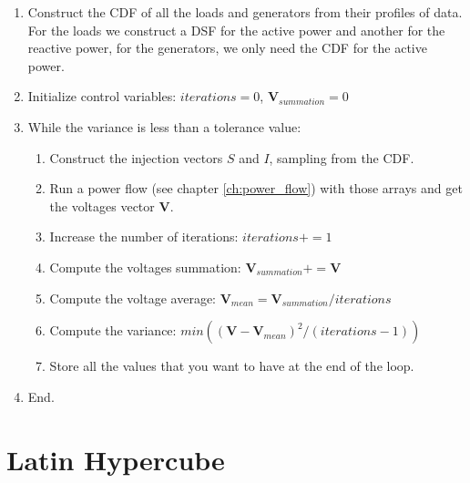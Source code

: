 \documentclass[nols,a4paper,twoside,notoc,fleqn]{tufte-book}
\begin{document}
\begin{enumerate}
	\item Construct the CDF of all the loads and generators from their profiles of data. For the loads we construct a DSF for the active power and another for the reactive power, for the generators, we only need the CDF for the active power.
	
	\item Initialize control variables: $iterations = 0$, $\textbf{V}_{summation} = 0$
	
	\item While the variance is less than a tolerance value:
	
	\begin{enumerate}
		\item Construct the injection vectors $S$ and $I$, sampling from the CDF.
		
		\item Run a power flow (see chapter \ref{ch:power_flow}) with those arrays and get the voltages vector $\textbf{V}$.
		
		\item Increase the number of iterations: $iterations += 1$
		
		\item Compute the voltages summation: $\textbf{V}_{summation} += \textbf{V}$
		
		\item Compute the voltage average: $\textbf{V}_{mean} = \textbf{V}_{summation} / iterations$
		
		\item Compute the variance: $min((\textbf{V} - \textbf{V}_{mean})^2 / (iterations - 1))$
		
		\item Store all the values that you want to have at the end of the loop.
		
	\end{enumerate}

	\item End.
\end{enumerate}






\section{Latin Hypercube}




\end{document}
